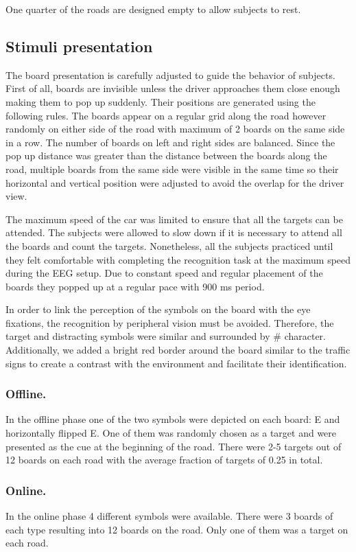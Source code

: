 \documentclass[12pt]{iopart}
\begin{document}
One quarter of the roads are designed empty to allow subjects to rest.

\subsection{Stimuli presentation}

The board presentation is carefully adjusted to guide the behavior of subjects.
First of all, boards are invisible unless the driver approaches them
close enough making them to pop up suddenly.
Their positions are generated using the following rules.
The boards appear on a regular grid along the road however
randomly on either side of the road with maximum of 2 boards
on the same side in a row. The number of boards on left
and right sides are balanced. Since the pop up distance was greater
than the distance between the boards along the road, multiple
boards from the same side were visible in the same time
so their horizontal and vertical position were adjusted to avoid
the overlap for the driver view.

The maximum speed of the car was limited to ensure that all the targets
can be attended. The subjects were allowed to slow down if it is necessary
to attend all the boards and count the targets.
Nonetheless, all the subjects practiced until they felt comfortable 
with completing the recognition task at the maximum speed
during the EEG setup.
Due to constant speed and regular placement of the boards they
popped up at a regular pace with 900 ms period.

In order to link the perception of the symbols on the board
with the eye fixations, the recognition by
peripheral vision must be avoided. Therefore, the target and distracting
symbols were similar and surrounded by \# character.
Additionally, we added a bright red border around the board similar 
to the traffic signs
to create a contrast with the environment and facilitate
their identification.

\subsubsection*{Offline.}
In the offline phase one of the two symbols were depicted on each board:
E and horizontally flipped E.
One of them was randomly chosen as a target and were presented as the cue
at the beginning of the road. There were 2-5 targets out of 12 boards
on each road with the average fraction of targets of 0.25 in total.
\subsubsection*{Online.}
In the online phase 4 different symbols were available. There were
3 boards of each type resulting into 12 boards on the road.
Only one of them was a target on each road.
\end{document}
